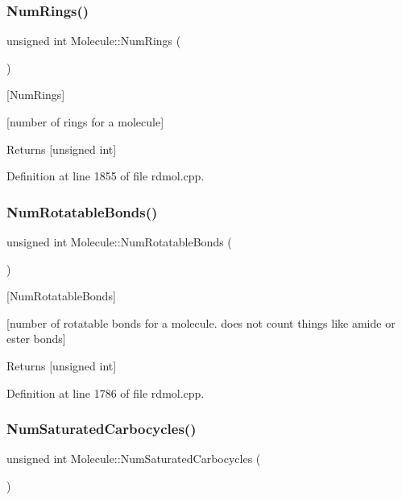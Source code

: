 \subsubsection{\texorpdfstring{Num\+Rings()}{NumRings()}}
{\footnotesize\ttfamily unsigned int Molecule\+::\+Num\+Rings (\begin{DoxyParamCaption}{ }\end{DoxyParamCaption})}



\mbox{[}Num\+Rings\mbox{]} 

\mbox{[}number of rings for a molecule\mbox{]}

\begin{DoxyReturn}{Returns}
\mbox{[}unsigned int\mbox{]} 
\end{DoxyReturn}


Definition at line 1855 of file rdmol.\+cpp.

\mbox{\label{class_molecule_a1185b821c895d5bfd39d194570749524}} 
\subsubsection{\texorpdfstring{Num\+Rotatable\+Bonds()}{NumRotatableBonds()}}
{\footnotesize\ttfamily unsigned int Molecule\+::\+Num\+Rotatable\+Bonds (\begin{DoxyParamCaption}{ }\end{DoxyParamCaption})}



\mbox{[}Num\+Rotatable\+Bonds\mbox{]} 

\mbox{[}number of rotatable bonds for a molecule. does not count things like amide or ester bonds\mbox{]}

\begin{DoxyReturn}{Returns}
\mbox{[}unsigned int\mbox{]} 
\end{DoxyReturn}


Definition at line 1786 of file rdmol.\+cpp.

\mbox{\label{class_molecule_a63f6f6403e648006f25feb9103add3ce}} 
\subsubsection{\texorpdfstring{Num\+Saturated\+Carbocycles()}{NumSaturatedCarbocycles()}}
{\footnotesize\ttfamily unsigned int Molecule\+::\+Num\+Saturated\+Carbocycles (\begin{DoxyParamCaption}{ }\end{DoxyParamCaption})}



